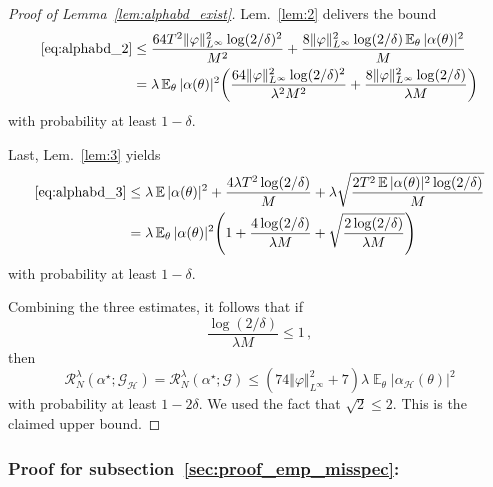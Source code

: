 \documentclass{article}
\theoremstyle{plain}
\theoremstyle{my_def}
\theoremstyle{my_rem}
\numberwithin{equation}{section}
\numberwithin{theorem}{section}%
\newcommand{\E}{\mathbb{E}}
\newcommand{\scrR}{\mathscr{R}}
\newcommand{\cG}{\mathcal{G}}
\newcommand{\cH}{\mathcal{H}}
\let\originalleft\left %
\let\originalright\right
\renewcommand{\left}{\mathopen{}\mathclose\bgroup\originalleft}
\renewcommand{\right}{\aftergroup\egroup\originalright}
\renewcommand{\E}{\operatorname{\mathbb{E}}} %
\newcommand{\al}{\alpha}
\newcommand{\GH}{\cG_{\cH}}
\renewcommand{\phi}{\varphi}
\newcommand{\alst}{\al^{\star}}
\begin{document}
\begin{proof}[Proof of Lemma~\ref{lem:alphabd_exist}]
Lem.~\ref{lem:2} delivers the bound
\begin{align*}
\eqref{eq:alphabd_2}
&\le  \frac{64 T^2 \Vert \phi \Vert_{L^\infty}^2 \log(2/\delta)^2}{M^2} + \frac{8\Vert \phi \Vert_{L^\infty}^2\log(2/\delta) \E_\theta|\al(\theta)|^2}{M}
\\
&= 
\lambda \E_\theta|\alpha(\theta)|^2
\left(
\frac{64 \Vert \phi \Vert_{L^\infty}^2 \log(2/\delta)^2}{\lambda^2 M^2} + \frac{8\Vert \phi \Vert_{L^\infty}^2\log(2/\delta) }{\lambda M}
\right)
\end{align*}
with probability at least $ 1-\delta$.

Last, Lem.~\ref{lem:3} yields
\begin{align*}
\eqref{eq:alphabd_3}
&\le
\lambda \E|\al(\theta)|^2
+ \frac{4\lambda T^2 \log(2/\delta)}{M} + \lambda\sqrt{\frac{2T^2 \E|\al(\theta)|^2\log(2/\delta)}{M}}
\\
&=
\lambda \E_\theta |\al(\theta)|^2 
\left(
1 + \frac{4\log(2/\delta)}{\lambda M} + \sqrt{\frac{2\log(2/\delta)}{\lambda M}}
\right)
\end{align*}
with probability at least $ 1-\delta$.

Combining the three estimates, it follows that if 
\begin{equation*}
    \frac{\log(2/\delta)}{\lambda M} \le 1\,,
\end{equation*}
then
\begin{equation*}
    \scrR_N^\lambda(\alst;\GH)=\scrR_N^\lambda(\alst;\cG) \le  (74 \Vert \phi \Vert_{L^\infty}^2 + 7) \lambda\E_\theta|\al_\cH(\theta)|^2
\end{equation*}
with probability at least $ 1-2\delta$. We used the fact that $\sqrt{2}\leq 2$. This is the claimed upper bound.
\end{proof}

\subsubsection{Proof for subsection~\ref{sec:proof_emp_misspec}:~}\label{app:proof_proof_emp_misspec}
\end{document}
